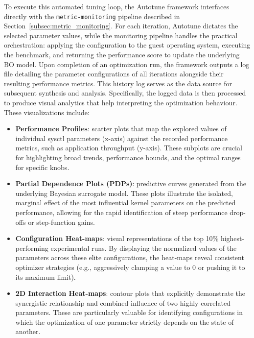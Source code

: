 To execute this automated tuning loop, the Autotune framework interfaces  directly with the \texttt{metric-monitoring} pipeline described in Section~\ref{subsec:metric_monitoring}.
For each iteration, Autotune dictates the selected parameter values, while the monitoring pipeline handles the practical orchestration: applying the configuration to the guest operating system, executing the benchmark, and returning the performance score to update the underlying BO model.
Upon completion of an optimization run, the framework outputs a log file detailing the parameter configurations of all iterations alongside their resulting performance metrics.
This history log serves as the data source for subsequent synthesis and analysis.
Specifically, the logged data is then processed to produce visual analytics that help interpreting the optimization behaviour. These visualizations include:
\begin{itemize}
    \item \textbf{Performance Profiles}: scatter plots that map the explored values of individual sysctl parameters (x-axis) against the recorded performance metrics, such as application throughput (y-axis). These subplots are crucial for highlighting broad trends, performance bounds, and the optimal ranges for specific knobs.
    \item \textbf{Partial Dependence Plots (PDPs)}: predictive curves generated from the underlying Bayesian surrogate model. These plots illustrate the isolated, marginal effect of the most influential kernel parameters on the predicted performance, allowing for the rapid identification of steep performance drop-offs or step-function gains.
    \item \textbf{Configuration Heat-maps}: visual representations of the top 10\% highest-performing experimental runs. By displaying the normalized values of the parameters across these elite configurations, the heat-maps reveal consistent optimizer strategies (e.g., aggressively clamping a value to 0 or pushing it to its maximum limit).
    \item \textbf{2D Interaction Heat-maps}: contour plots that explicitly demonstrate the synergistic relationship and combined influence of two highly correlated parameters. These are particularly valuable for identifying configurations in which the optimization of one parameter strictly depends on the state of another.
\end{itemize}

